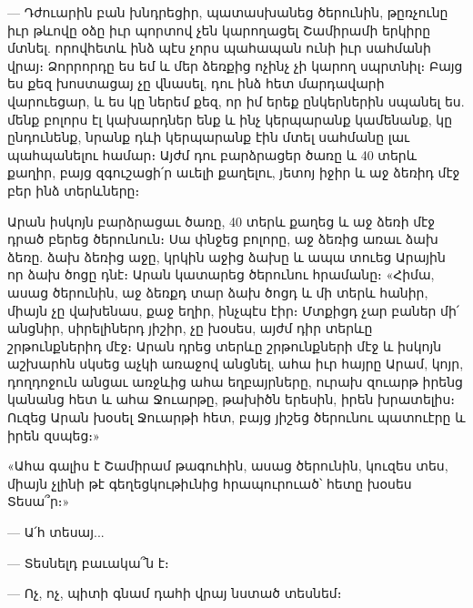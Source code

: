 \documentclass{article}
\begin{document}
{— Դժուարին բան խնդրեցիր, պատասխանեց ծերունին, թըռչունը իւր թևովը օձը իւր պորտով չեն կարողացել Շամիրամի երկիրը մտնել. որովհետև ինձ պէս չորս պահապան ունի իւր սահմանի վրայ։ Ձորրորդը ես եմ և մեր ձեռքից ոչինչ չի կարող սպրտնիլ։ Բայց ես քեզ խոստացայ չը վնասել, դու ինձ հետ մարդավարի վարուեցար, և ես կը ներեմ քեզ, որ իմ երեք ընկերներին սպանել ես. մենք բոլորս էլ կախարդներ ենք և ինչ կերպարանք կամենանք, կը ընդունենք, նրանք դևի կերպարանք էին մտել սահմանը լաւ պահպանելու համար։ Այժմ դու բարձրացեր ծառը և 40 տերև քաղիր, բայց զգուշացի՛ր աւելի քաղելու, յետոյ իջիր և աջ ձեռիդ մէջ բեր ինձ տերևները։

Արան իսկոյն բարձրացաւ ծառը, 40 տերև քաղեց և աջ ձեռի մէջ դրած բերեց ծերունուն։ Սա փնջեց բոլորը, աջ ձեռից առաւ ձախ ձեռը. ձախ ձեռից աջը, կրկին աջից ձախը և ապա տուեց Արային որ ձախ ծոցը դնէ։ Արան կատարեց ծերունու հրամանը։ «Հիմա, ասաց ծերունին, աջ ձեռքդ տար ձախ ծոցդ և մի տերև հանիր, միայն չը վախենաս, քաջ եղիր, ինչպէս էիր։ Մտքիցդ չար բաներ մի՛ անցնիր, սիրելիներդ յիշիր, չը խօսես, այժմ դիր տերևը շրթունքներիդ մէջ։ Արան դրեց տերևը շրթունքների մէջ և իսկոյն աշխարհն սկսեց աչկի առաջով անցնել, ահա իւր հայրը Արամ, կոյր, դողդոջուն անցաւ առջևից ահա եղբայրները, ուրախ զուարթ իրենց կանանց հետ և ահա Ջուարթը, թախիծն երեսին, իրեն խրատելիս։ Ուզեց Արան խօսել Ջուարթի հետ, բայց յիշեց ծերունու պատուէրը և իրեն զսպեց։»

«Ահա գալիս է Շամիրամ թագուհին, ասաց ծերունին, կուզես տես, միայն չլինի թէ գեղեցկութիւնից հրապուրուած՝ հետը խօսես Տեսա՞ր։»

— Ա՛հ տեսայ...

— Տեսնելդ բաւակա՞ն է։

— Ոչ, ոչ, պիտի գնամ դահի վրայ նստած տեսնեմ։

}
\end{document}
